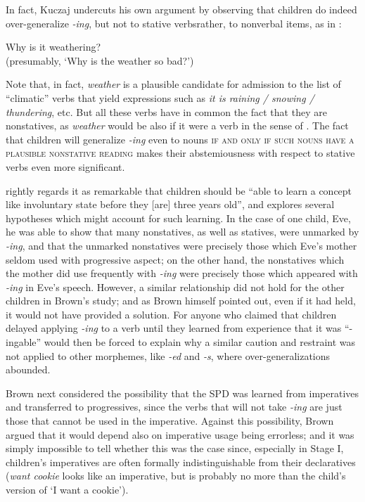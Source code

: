 In fact, Kuczaj undercuts his own argument by observing that children do indeed over-generalize \textit{-ing}, but not to stative verbs\-rather, to nonverbal items, as in :

\ea\label{ex:3:15}
 Why is it weathering?\\
\glt (presumably, `Why is the weather so bad?')
\z

\noindent Note that, in fact, \textit{weather} is a plausible candidate for admission to the list of ``climatic'' verbs that yield expressions such as \textit{it is raining / snowing / thundering}, etc. But all these verbs have in common the fact that they are nonstatives, as \textit{weather} would be also if it were a verb in the sense of . The fact that children will generalize \textit{-ing} even to nouns \textsc{if and only if such nouns have a plausible nonstative reading} makes their abstemiousness with respect to stative verbs even more significant.

\citet[326ff]{Brown1973} rightly regards it as remarkable that chil\-dren should be ``able to learn a concept like involuntary state before they [are] three years old'', and explores several hypotheses which might account for such learning. In the case of one child, Eve, he was able to show that many nonstatives, as well as statives, were unmarked by \textit{-ing}, and that the unmarked nonstatives were precisely those which Eve's mother seldom used with progressive aspect; on the other hand, the nonstatives which the mother did use frequently with \textit{-ing} were precisely those which appeared with \textit{-ing} in Eve's speech. However, a similar relationship did not hold for the other children in Brown's study; and as Brown himself pointed out, even if it had held, it would not have provided a solution. For anyone who claimed that children delayed applying \textit{-ing} to a verb until they learned from experience that it was ``-ingable'' would then be forced to explain why a similar caution and restraint was not applied to other morphemes, like \textit{-ed} and \textit{-s}, where over-generalizations abounded.

Brown next considered the possibility that the SPD was learned from imperatives and transferred to progressives, since the verbs that will not take \textit{-ing} are just those that cannot be used in the imperative. Against this possibility, Brown argued that it would depend also on imperative usage being errorless; and it was simply impossible to tell whether this was the case since, especially in Stage I, children's impera\-tives are often formally indistinguishable from their declaratives (\textit{want cookie} looks like an imperative, but is probably no more than the child's version of `I want a cookie').

